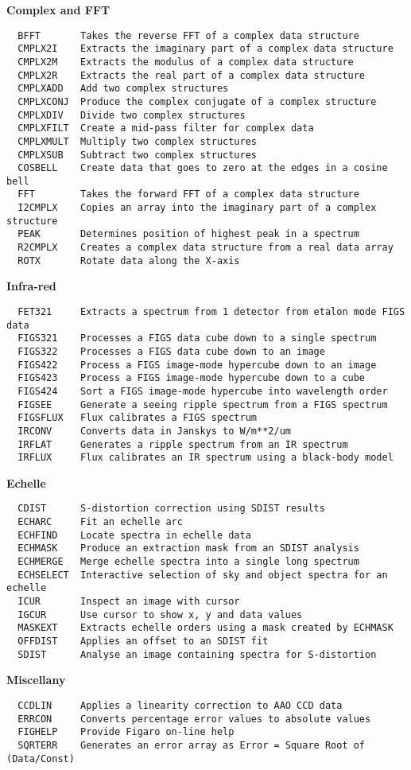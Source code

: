 \goodbreak
{\bf Complex and FFT}
\begin{verbatim}
  BFFT       Takes the reverse FFT of a complex data structure
  CMPLX2I    Extracts the imaginary part of a complex data structure
  CMPLX2M    Extracts the modulus of a complex data structure
  CMPLX2R    Extracts the real part of a complex data structure
  CMPLXADD   Add two complex structures
  CMPLXCONJ  Produce the complex conjugate of a complex structure
  CMPLXDIV   Divide two complex structures
  CMPLXFILT  Create a mid-pass filter for complex data
  CMPLXMULT  Multiply two complex structures
  CMPLXSUB   Subtract two complex structures
  COSBELL    Create data that goes to zero at the edges in a cosine bell
  FFT        Takes the forward FFT of a complex data structure
  I2CMPLX    Copies an array into the imaginary part of a complex structure
  PEAK       Determines position of highest peak in a spectrum
  R2CMPLX    Creates a complex data structure from a real data array
  ROTX       Rotate data along the X-axis
\end{verbatim}
\goodbreak
{\bf Infra-red}
\begin{verbatim}
  FET321     Extracts a spectrum from 1 detector from etalon mode FIGS data
  FIGS321    Processes a FIGS data cube down to a single spectrum
  FIGS322    Processes a FIGS data cube down to an image
  FIGS422    Process a FIGS image-mode hypercube down to an image
  FIGS423    Process a FIGS image-mode hypercube down to a cube
  FIGS424    Sort a FIGS image-mode hypercube into wavelength order
  FIGSEE     Generate a seeing ripple spectrum from a FIGS spectrum
  FIGSFLUX   Flux calibrates a FIGS spectrum
  IRCONV     Converts data in Janskys to W/m**2/um
  IRFLAT     Generates a ripple spectrum from an IR spectrum
  IRFLUX     Flux calibrates an IR spectrum using a black-body model
\end{verbatim}
\goodbreak
{\bf Echelle}
\begin{verbatim}
  CDIST      S-distortion correction using SDIST results
  ECHARC     Fit an echelle arc
  ECHFIND    Locate spectra in echelle data
  ECHMASK    Produce an extraction mask from an SDIST analysis
  ECHMERGE   Merge echelle spectra into a single long spectrum
  ECHSELECT  Interactive selection of sky and object spectra for an echelle
  ICUR       Inspect an image with cursor
  IGCUR      Use cursor to show x, y and data values
  MASKEXT    Extracts echelle orders using a mask created by ECHMASK
  OFFDIST    Applies an offset to an SDIST fit
  SDIST      Analyse an image containing spectra for S-distortion
\end{verbatim}
\goodbreak
{\bf Miscellany}
\begin{verbatim}
  CCDLIN     Applies a linearity correction to AAO CCD data
  ERRCON     Converts percentage error values to absolute values
  FIGHELP    Provide Figaro on-line help
  SQRTERR    Generates an error array as Error = Square Root of (Data/Const)
\end{verbatim}


